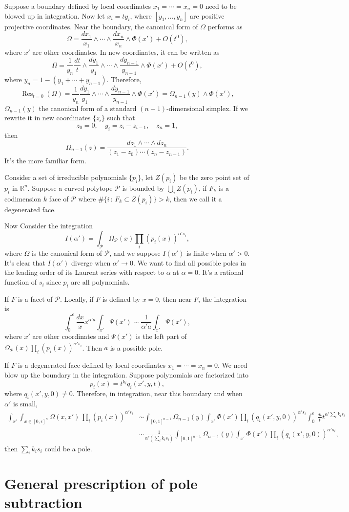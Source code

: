 \documentclass[12pt]{article}
\theoremstyle{definition}
\theoremstyle{plain}
\begin{document}
Suppose a boundary defined by local coordinates $x_1=\cdots=x_n=0$ need to be blowed up in integration. Now let $x_i=ty_i$, where $[y_1,\dots,y_n]$ are positive projective coordinates. Near the boundary, the canonical form of $\Omega$ performs as 
\[
	\Omega=\frac{dx_1}{x_1}\wedge \cdots\wedge\frac{dx_n}{x_n}
	\wedge \Phi(x')+O(t^0),
\]
where $x'$ are other coordinates. In new coordinates, it can be written as 
\[
	\Omega=\frac{1}{y_n}\frac{dt}{t}\wedge \frac{dy_1}{y_1}\wedge \cdots\wedge\frac{dy_{n-1}}{y_{n-1}}\wedge \Phi(x')+O(t^0),
\]
where $y_n=1-(y_1+\cdots+y_{n-1})$. Therefore,
\[
	\operatorname{Res}_{t=0}(\Omega)=\frac{1}{y_n}\frac{dy_1}{y_1}\wedge \cdots\wedge\frac{dy_{n-1}}{y_{n-1}}\wedge \Phi(x')=\Omega_{n-1}(y)\wedge \Phi(x'),
\]
$\Omega_{n-1}(y)$ the canonical form of a standard $(n-1)$-dimensional simplex. If we rewrite it in new coordinates $\{z_i\}$ such that
\[
	z_0=0,\quad y_i=z_i-z_{i-1},\quad z_{n}=1,
\]
then 
\[
	\Omega_{n-1}(z)=\frac{dz_1\wedge\cdots\wedge dz_n}{(z_1-z_0)\cdots (z_n-z_{n-1})}.
\]
It's the more familiar form.

Consider a set of irreducible polynomials $\{p_i\}$, let $Z(p_i)$ be the zero point set of $p_i$ in $\mathbb{R}^n$. Suppose a curved polytope $\mathcal P$ is bounded by $\bigcup_i Z(p_i)$, if $F_k$ is a codimension $k$ face of $\mathcal P$ where $\#\{i\,:\,F_k\subset Z(p_i)\}>k$, then we call it a degenerated face.

Now Consider the integration
\[
	I(\alpha')=\int_{\mathcal P} \Omega_{\mathcal P}(x)\prod_i(p_i(x))^{\alpha' s_i},
\]
where $\Omega$ is the canonical form of $\mathcal P$, and we suppose $I(\alpha')$ is finite when $\alpha'>0$.
It's clear that $I(\alpha')$ diverge when $\alpha'\to 0$. We want to find all possible poles in the leading order of its Laurent series with respect to $\alpha$ at $\alpha=0$. It's a rational function of $s_i$ since $p_i$ are all polynomials.

If $F$ is a facet of $\mathcal P$. Locally, if $F$ is defined by $x=0$, then near $F$, the integration is 
\[
	\int_0^\epsilon \frac{d x}{x} x^{\alpha' a} \int_{x'}\Psi(x')
	\sim \frac{1}{\alpha' a}\int_{x'}\Psi(x'),
\]
where $x'$ are other coordinates and $\Psi(x')$ is the left part of $\Omega_{\mathcal P}(x)\prod_i(p_i(x))^{\alpha' s_i}$. Then $a$ is a possible pole.

If $F$ is a degenerated face defined by local coordinates $x_1=\cdots=x_n=0$. We need blow up the boundary in the integration. Suppose polynomials are factorized into
\[
	p_i(x)=t^{k_i}q_i(x',y,t),
\]
where $q_i(x',y,0)\neq 0$. Therefore, in integration, near this boundary and when $\alpha'$ is small, 
\[
	\begin{aligned}
		\int_{x'} \int_{x\in [0,\epsilon]^n} \Omega(x,x')\, \prod_i(p_i(x))^{\alpha' s_i}
		&\sim 
		\int_{[0,1]^{n-1}}\Omega_{n-1}(y)
		\int_{x'}\Phi(x')\prod_i
		(q_i(x',y,0))^{\alpha' s_i}
		\int_0^\epsilon \, \frac{dt}{t} t^{\alpha' \sum_i k_is_i}\\
		&\sim \frac{1}{\alpha' (\sum_i k_is_i)}
		\int_{[0,1]^{n-1}}\Omega_{n-1}(y)
		\int_{x'}\Phi(x')\prod_i
		(q_i(x',y,0))^{\alpha' s_i},
	\end{aligned}
\]
then $\sum_i k_is_i$ could be a pole. 


\section{General prescription of pole subtraction}
\end{document}
